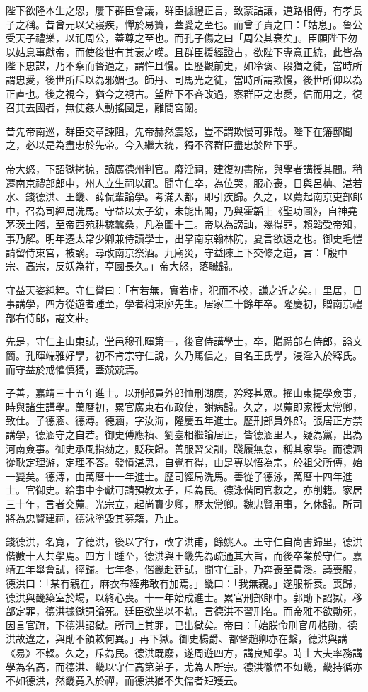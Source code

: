 \begin{pinyinscope}
陛下欲隆本生之恩，屢下群臣會議，群臣據禮正言，致蒙詰讓，道路相傳，有孝長子之稱。昔曾元以父寢疾，憚於易簀，蓋愛之至也。而曾子責之曰：「姑息」。魯公受天子禮樂，以祀周公，蓋尊之至也。而孔子傷之曰「周公其衰矣」。臣願陛下勿以姑息事獻帝，而使後世有其衰之嘆。且群臣援經證古，欲陛下專意正統，此皆為陛下忠謀，乃不察而督過之，謂忤且慢。臣歷觀前史，如冷褒、段猶之徒，當時所謂忠愛，後世所斥以為邪媚也。師丹、司馬光之徒，當時所謂欺慢，後世所仰以為正直也。後之視今，猶今之視古。望陛下不吝改過，察群臣之忠愛，信而用之，復召其去國者，無使姦人動搖國是，離間宮闈。

昔先帝南巡，群臣交章諫阻，先帝赫然震怒，豈不謂欺慢可罪哉。陛下在籓邸聞之，必以是為盡忠於先帝。今入繼大統，獨不容群臣盡忠於陛下乎。

帝大怒，下詔獄拷掠，謫廣德州判官。廢淫祠，建復初書院，與學者講授其間。稍遷南京禮部郎中，州人立生祠以祀。聞守仁卒，為位哭，服心喪，日與呂柟、湛若水、錢德洪、王畿、薛侃輩論學。考滿入都，即引疾歸。久之，以薦起南京吏部郎中，召為司經局洗馬。守益以太子幼，未能出閣，乃與霍韜上《聖功圖》，自神堯茅茨土階，至帝西苑耕稼蠶桑，凡為圖十三。帝以為謗訕，幾得罪，賴韜受帝知，事乃解。明年遷太常少卿兼侍讀學士，出掌南京翰林院，夏言欲遠之也。御史毛愷請留侍東宮，被謫。尋改南京祭酒。九廟災，守益陳上下交修之道，言：「殷中宗、高宗，反妖為祥，亨國長久。」帝大怒，落職歸。

守益天姿純粹。守仁嘗曰：「有若無，實若虛，犯而不校，謙之近之矣。」里居，日事講學，四方從遊者踵至，學者稱東廓先生。居家二十餘年卒。隆慶初，贈南京禮部右侍郎，謚文莊。

先是，守仁主山東試，堂邑穆孔暉第一，後官侍講學士，卒，贈禮部右侍郎，謚文簡。孔暉端雅好學，初不肯宗守仁說，久乃篤信之，自名王氏學，浸淫入於釋氏。而守益於戒懼慎獨，蓋兢兢焉。

子善，嘉靖三十五年進士。以刑部員外郎恤刑湖廣，矜釋甚眾。擢山東提學僉事，時與諸生講學。萬曆初，累官廣東右布政使，謝病歸。久之，以薦即家授太常卿，致仕。子德涵、德溥。德涵，字汝海，隆慶五年進士。歷刑部員外郎。張居正方禁講學，德涵守之自若。御史傅應禎、劉臺相繼論居正，皆德涵里人，疑為黨，出為河南僉事。御史承風指劾之，貶秩歸。善服習父訓，踐履無怠，稱其家學。而德涵從耿定理游，定理不答。發憤湛思，自覺有得，由是專以悟為宗，於祖父所傳，始一變矣。德溥，由萬曆十一年進士。歷司經局洗馬。善從子德泳，萬曆十四年進士。官御史。給事中李獻可請預教太子，斥為民。德泳偕同官救之，亦削籍。家居三十年，言者交薦。光宗立，起尚寶少卿，歷太常卿。魏忠賢用事，乞休歸。所司將為忠賢建祠，德泳塗毀其募籍，乃止。

錢德洪，名寬，字德洪，後以字行，改字洪甫，餘姚人。王守仁自尚書歸里，德洪偕數十人共學焉。四方士踵至，德洪與王畿先為疏通其大旨，而後卒業於守仁。嘉靖五年舉會試，徑歸。七年冬，偕畿赴廷試，聞守仁訃，乃奔喪至貴溪。議喪服，德洪曰：「某有親在，麻衣布絰弗敢有加焉。」畿曰：「我無親。」遂服斬衰。喪歸，德洪與畿築室於場，以終心喪。十一年始成進士。累官刑部郎中。郭勛下詔獄，移部定罪，德洪據獄詞論死。廷臣欲坐以不軌，言德洪不習刑名。而帝雅不欲勛死，因言官疏，下德洪詔獄。所司上其罪，已出獄矣。帝曰：「始朕命刑官毋梏勛，德洪故違之，與勛不領敕何異。」再下獄。御史楊爵、都督趙卿亦在繫，德洪與講《易》不輟。久之，斥為民。德洪既廢，遂周遊四方，講良知學。時士大夫率務講學為名高，而德洪、畿以守仁高第弟子，尤為人所宗。德洪徹悟不如畿，畿持循亦不如德洪，然畿竟入於禪，而德洪猶不失儒者矩矱云。


\end{pinyinscope}
